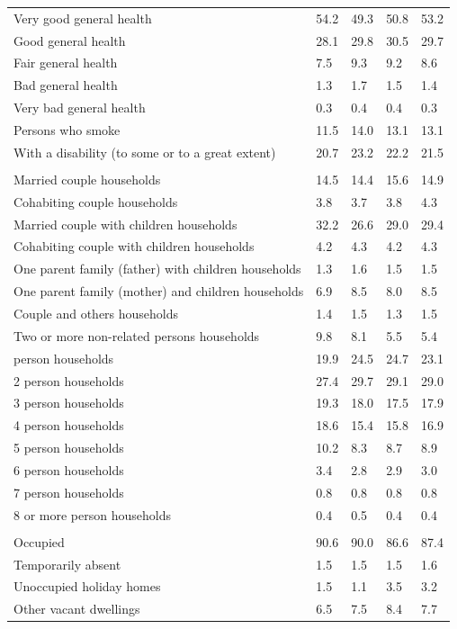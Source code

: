 \documentclass{article}
\begin{document}
\begin{table}[h]
\begin{tabular}{KTTTT}
    \hline
Very good general health & 54.2& 49.3&50.8& 53.2\\
Good general health & 28.1& 29.8& 30.5& 29.7\\
Fair general health & 7.5& 9.3&9.2& 8.6\\
Bad general health & 1.3& 1.7&1.5& 1.4\\
Very bad general health & 0.3& 0.4&0.4& 0.3\\
    \hline
Persons who smoke & 11.5& 14.0&13.1& 13.1\\
    \hline
With a disability (to some or to a great extent) & 20.7& 23.2&22.2& 21.5\\
\hline
    \\ 
    \hline
Married couple households & 14.5& 14.4& 15.6& 14.9\\
Cohabiting couple households & 3.8& 3.7& 3.8& 4.3\\
Married couple with children households & 32.2& 26.6& 29.0& 29.4\\
Cohabiting couple with children households & 4.2& 4.3& 4.2& 4.3\\
One parent family (father) with  children households & 1.3& 1.6& 1.5& 1.5\\
One parent family (mother) and children households & 6.9& 8.5& 8.0& 8.5\\
Couple and others households  & 1.4& 1.5& 1.3& 1.5\\
Two or more non-related persons households & 9.8& 8.1& 5.5& 5.4\\
     person households & 19.9& 24.5& 24.7& 23.1\\
2 person households & 27.4& 29.7& 29.1& 29.0\\
3 person households & 19.3& 18.0& 17.5& 17.9\\
4 person households & 18.6& 15.4& 15.8& 16.9\\
5 person households & 10.2&  8.3&  8.7&  8.9\\
6 person households & 3.4& 2.8& 2.9& 3.0\\
7 person households & 0.8& 0.8& 0.8& 0.8\\
8 or more person households & 0.4& 0.5& 0.4& 0.4\\
\hline
    \\ 
    \hline
Occupied & 90.6& 90.0& 86.6& 87.4\\
Temporarily absent & 1.5& 1.5& 1.5& 1.6\\
Unoccupied holiday homes & 1.5& 1.1& 3.5& 3.2\\
Other vacant dwellings & 6.5& 7.5& 8.4& 7.7\\
\hline
\end{tabular}
\end{table}
\end{document}
